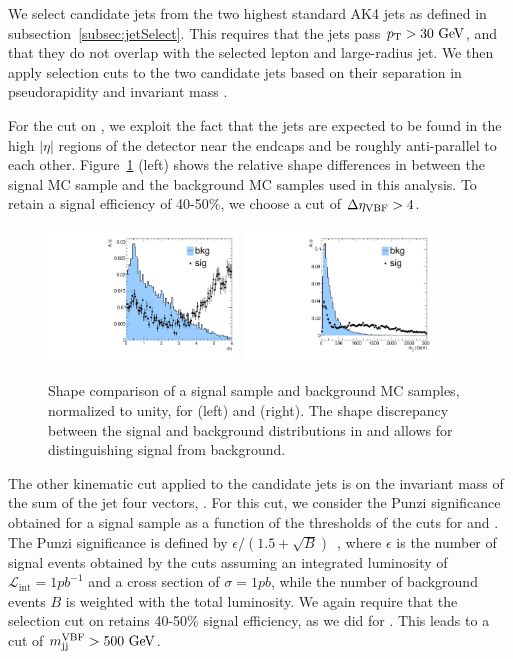 We select candidate \VBF jets from the two highest \pt standard AK4 jets as defined in subsection~\ref{subsec:jetSelect}.
This requires that the \VBF jets pass $\pt>30\unit{GeV}$, and that they do not overlap with the selected lepton and large-radius jet.
We then apply selection cuts to the two candidate \VBF jets based on their separation in pseudorapidity \DetaVBF and \VBF invariant mass \mjjVBF.

For the cut on \DetaVBF, we exploit the fact that the \VBF jets are expected to be found in the high $|\eta|$ regions of the detector near the endcaps and be roughly anti-parallel to each other.
Figure~\ref{fig:detaSB_VBF} (left) shows the relative shape differences in \DetaVBF between the \VBF\RadtoWW signal MC sample and the background MC samples used in this analysis.
To retain a signal efficiency of 40-50\%, we choose a cut of $\DetaVBF>4$.

\begin{figure}[htbp]
  \centering
  \includegraphics[width=0.45\textwidth]{fig/eventSelection/detaSB.pdf}
  \includegraphics[width=0.45\textwidth]{fig/eventSelection/mjjSB.pdf}
  \caption{
    Shape comparison of a \VBF\RadtoWW signal sample and background MC samples, normalized to unity, for \DetaVBF (left) and \mjjVBF (right).
    The shape discrepancy between the \VBF signal and background distributions in \DetaVBF and \mjjVBF allows for distinguishing signal from background.
  }
  \label{fig:detaSB_VBF}
\end{figure}

The other kinematic cut applied to the \VBF candidate jets is on the invariant mass of the sum of the \VBF jet four vectors, \mjjVBF.
For this cut, we consider the Punzi significance obtained for a \VBF signal sample as a function of the thresholds of the cuts for \DetaVBF and \mjjVBF.
The Punzi significance is defined by $\epsilon/(1.5+\sqrt{B})$~\cite{Punzi:2003bu}, where $\epsilon$ is the number of signal events obtained by the cuts assuming an integrated luminosity of $\mathcal{L}_\mathrm{int}=1\unit{pb^{-1}}$ and a cross section of $\sigma=1\unit{pb}$, while the number of background events $B$ is weighted with the total luminosity.
We again require that the selection cut on \mjjVBF retains 40-50\% signal efficiency, as we did for \DetaVBF.
This leads to a cut of $\mjjVBF>500\unit{GeV}$.

